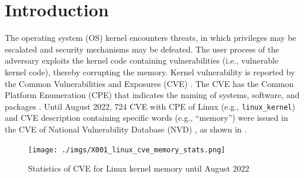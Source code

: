 \section{Introduction}\label{seciton:introduction}
%
The operating system (OS) kernel encounters threats, in which privileges may be
escalated and security mechanisms may be defeated.
The user process of the adversary exploits the kernel code containing
vulnerabilities (i.e., vulnerable kernel code), thereby corrupting the memory.
%
Kernel vulnerability is reported by the Common Vulnerabilities and Exposures
(CVE) \cite{cve}. The CVE has the Common Platform Enumeration (CPE) that
indicates the naming of systems, software, and packages \cite{cpe}.
%
Until August 2022, 724 CVE with CPE of Linux (e.g., \verb|linux_kernel|) and CVE
description containing specific words (e.g., ``memory'') were issued in the CVE of
National Vulnerability Database (NVD) \cite{nvd}, as shown in
.

\begin{figure}[tb]
    \hspace{-5ex}
        \begin{center}
          \texttt{[image: ./imgs/X001\_linux\_cve\_memory\_stats.png]}
        \end{center}
        \caption{
          Statistics of CVE for Linux kernel memory until August 2022 \cite{nvd}
        }
        \label{fig:linux_memory_cve}
\end{figure}

